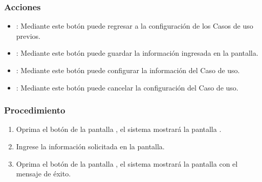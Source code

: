 \subsubsection{Acciones}
\begin{itemize}
    \item {}: Mediante este botón puede regresar a la configuración de los Casos de uso previos.
    \item {}: Mediante este botón puede guardar la información ingresada en la pantalla.
    \item {}: Mediante este botón puede configurar la información del Caso de uso.
    \item {}: Mediante este botón puede cancelar la configuración del Caso de uso.
\end{itemize}
	
	
\subsubsection{Procedimiento}
\begin{enumerate}
	\item Oprima el botón  de la pantalla , el sistema mostrará la pantalla . 

	
	\item Ingrese la información solicitada en la pantalla.
	
	\item Oprima el botón  de la pantalla , el sistema mostrará la pantalla 
	       con el mensaje de éxito.
\end{enumerate}



